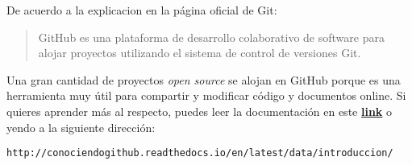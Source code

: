 De acuerdo a la explicacion en la página oficial de Git:

\begin{quote}
GitHub es una plataforma de desarrollo colaborativo de software para alojar proyectos utilizando el sistema de control de versiones Git.
\end{quote}

Una gran cantidad de proyectos \textit{open source} se alojan en GitHub porque es una herramienta muy útil para compartir y modificar código y documentos online. Si quieres aprender más al respecto, puedes leer la documentación en este \href{http://conociendogithub.readthedocs.io/en/latest/data/introduccion/} {\textbf{link}} o yendo a la siguiente dirección:

\begin{verbatim}
http://conociendogithub.readthedocs.io/en/latest/data/introduccion/
\end{verbatim} 


